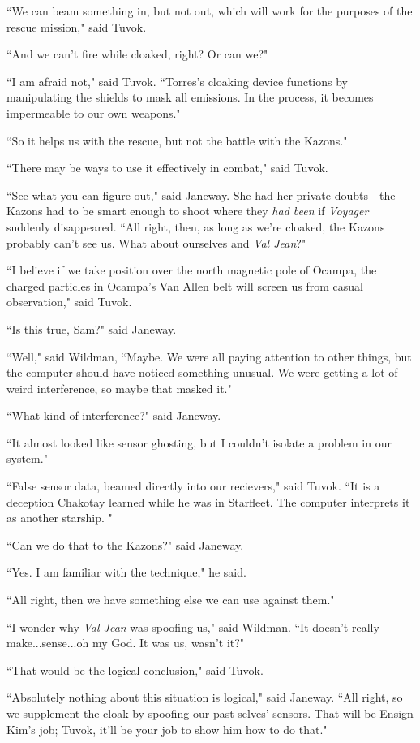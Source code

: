 \documentclass[twoside,letterpaper,12pt]{memoir}
\begin{document}
``We can beam something in, but not out, which will work for the purposes of the rescue mission," said Tuvok. 

``And we can't fire while cloaked, right? Or can we?" 

``I am afraid not," said Tuvok. ``Torres's cloaking device functions by manipulating the shields to mask all emissions. In the process, it becomes impermeable to our own weapons." 

``So it helps us with the rescue, but not the battle with the Kazons." 

``There may be ways to use it effectively in combat," said Tuvok. 

``See what you can figure out," said Janeway. She had her private doubts---the Kazons had to be smart enough to shoot where they \textit{had been} if \textit{Voyager} suddenly disappeared. ``All right, then, as long as we're cloaked, the Kazons probably can't see us. What about ourselves and \textit{Val Jean}?" 

``I believe if we take position over the north magnetic pole of Ocampa, the charged particles in Ocampa's Van Allen belt will screen us from casual observation," said Tuvok. 

``Is this true, Sam?" said Janeway. 

``Well," said Wildman, ``Maybe. We were all paying attention to other things, but the computer should have noticed something unusual. We were getting a lot of weird interference, so maybe that masked it." 

``What kind of interference?" said Janeway. 

``It almost looked like sensor ghosting, but I couldn't isolate a problem in our system." 

``False sensor data, beamed directly into our recievers," said Tuvok. ``It is a deception Chakotay learned while he was in Starfleet. The computer interprets it as another starship. " 

``Can we do that to the Kazons?" said Janeway. 

``Yes. I am familiar with the technique," he said. 

``All right, then we have something else we can use against them." 

``I wonder why \textit{Val Jean} was spoofing us," said Wildman. ``It doesn't really make...sense...oh my God. It was us, wasn't it?" 

``That would be the logical conclusion," said Tuvok. 

``Absolutely nothing about this situation is logical," said Janeway. ``All right, so we supplement the cloak by spoofing our past selves' sensors. That will be Ensign Kim's job; Tuvok, it'll be your job to show him how to do that." 
\end{document}
